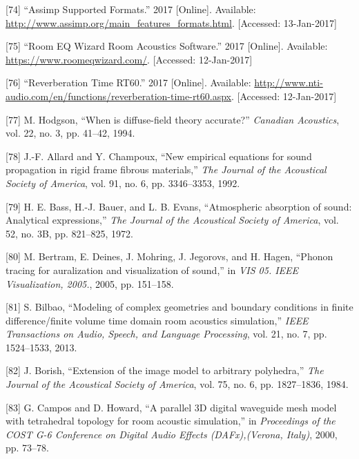 \documentclass[]{scrreprt}
\begin{document}
\hypertarget{ref-ux5fassimpux5f2017}{}
{[}74{]} ``Assimp Supported Formats.'' 2017 {[}Online{]}. Available:
\url{http://www.assimp.org/main_features_formats.html}. {[}Accessed:
13-Jan-2017{]}

\hypertarget{ref-ux5froomux5f2017}{}
{[}75{]} ``Room EQ Wizard Room Acoustics Software.'' 2017 {[}Online{]}.
Available: \url{https://www.roomeqwizard.com/}. {[}Accessed:
12-Jan-2017{]}

\hypertarget{ref-ux5freverberationux5f2017}{}
{[}76{]} ``Reverberation Time RT60.'' 2017 {[}Online{]}. Available:
\url{http://www.nti-audio.com/en/functions/reverberation-time-rt60.aspx}.
{[}Accessed: 12-Jan-2017{]}

\hypertarget{ref-hodgsonux5fwhenux5f1994}{}
{[}77{]} M. Hodgson, ``When is diffuse-field theory accurate?''
\emph{Canadian Acoustics}, vol. 22, no. 3, pp. 41--42, 1994.

\hypertarget{ref-allardux5fnewux5f1992}{}
{[}78{]} J.-F. Allard and Y. Champoux, ``New empirical equations for
sound propagation in rigid frame fibrous materials,'' \emph{The Journal
of the Acoustical Society of America}, vol. 91, no. 6, pp. 3346--3353,
1992.

\hypertarget{ref-bassux5fatmosphericux5f1972}{}
{[}79{]} H. E. Bass, H.-J. Bauer, and L. B. Evans, ``Atmospheric
absorption of sound: Analytical expressions,'' \emph{The Journal of the
Acoustical Society of America}, vol. 52, no. 3B, pp. 821--825, 1972.

\hypertarget{ref-bertramux5fphononux5f2005}{}
{[}80{]} M. Bertram, E. Deines, J. Mohring, J. Jegorovs, and H. Hagen,
``Phonon tracing for auralization and visualization of sound,'' in
\emph{VIS 05. IEEE Visualization, 2005.}, 2005, pp. 151--158.

\hypertarget{ref-bilbaoux5fmodelingux5f2013}{}
{[}81{]} S. Bilbao, ``Modeling of complex geometries and boundary
conditions in finite difference/finite volume time domain room acoustics
simulation,'' \emph{IEEE Transactions on Audio, Speech, and Language
Processing}, vol. 21, no. 7, pp. 1524--1533, 2013.

\hypertarget{ref-borishux5fextensionux5f1984}{}
{[}82{]} J. Borish, ``Extension of the image model to arbitrary
polyhedra,'' \emph{The Journal of the Acoustical Society of America},
vol. 75, no. 6, pp. 1827--1836, 1984.

\hypertarget{ref-camposux5fparallelux5f2000}{}
{[}83{]} G. Campos and D. Howard, ``A parallel 3D digital waveguide mesh
model with tetrahedral topology for room acoustic simulation,'' in
\emph{Proceedings of the COST G-6 Conference on Digital Audio Effects
(DAFx),(Verona, Italy)}, 2000, pp. 73--78.
\end{document}
